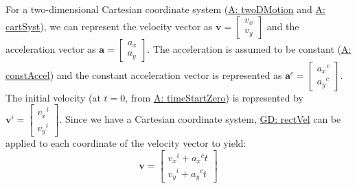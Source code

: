 \documentclass[12pt]{article}
\begin{document}
For a two-dimensional Cartesian coordinate system (\hyperref[twoDMotion]{A: twoDMotion} and \hyperref[cartSyst]{A: cartSyst}), we can represent the velocity vector as $\mathbf{v}=\begin{bmatrix}
{v_{x}}\\
{v_{y}}
\end{bmatrix}$ and the acceleration vector as $\mathbf{a}=\begin{bmatrix}
{a_{x}}\\
{a_{y}}
\end{bmatrix}$. The acceleration is assumed to be constant (\hyperref[constAccel]{A: constAccel}) and the constant acceleration vector is represented as ${\mathbf{a}^{c}}=\begin{bmatrix}
{{a_{x}}^{c}}\\
{{a_{y}}^{c}}
\end{bmatrix}$. The initial velocity (at $t=0$, from \hyperref[timeStartZero]{A: timeStartZero}) is represented by ${\mathbf{v}^{i}}=\begin{bmatrix}
{{v_{x}}^{i}}\\
{{v_{y}}^{i}}
\end{bmatrix}$. Since we have a Cartesian coordinate system, \hyperref[GD:rectVel]{GD: rectVel} can be applied to each coordinate of the velocity vector to yield:
\begin{displaymath}
\mathbf{v}=\begin{bmatrix}
{{v_{x}}^{i}}+{{a_{x}}^{c}} t\\
{{v_{y}}^{i}}+{{a_{y}}^{c}} t
\end{bmatrix}
\end{displaymath}
\par~
\end{document}
